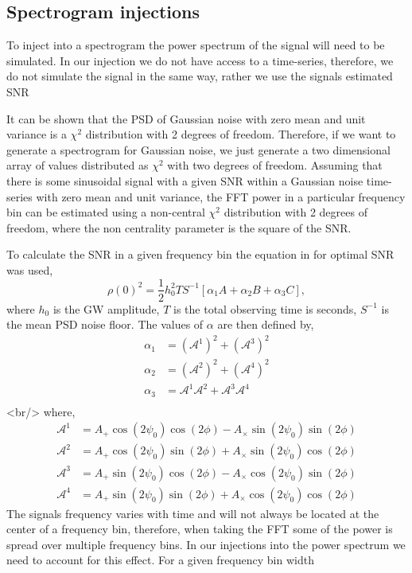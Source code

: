 \subsection{Spectrogram injections}

To inject into a spectrogram the power spectrum of the signal will need to be simulated. In our injection we do not have access to a time-series, therefore, we do not simulate the signal in the same way, rather we use the signals estimated \ac{SNR}

It can be shown that the \ac{PSD} of Gaussian noise with zero mean and unit variance is a $\chi^2$ distribution with 2 degrees of freedom. Therefore, if we want to generate a spectrogram for Gaussian noise, we just generate a two dimensional array of values distributed as $\chi^2$ with two degrees of freedom.
Assuming that there is some sinusoidal signal with a given \ac{SNR} within a Gaussian noise time-series with zero mean and unit variance, the \ac{FFT} power in a particular frequency bin can be estimated using a non-central $\chi^2$ distribution with 2 degrees of freedom, where the non centrality parameter is the square of the \ac{SNR}. 

To calculate the \ac{SNR} in a given frequency bin the equation in \citep{Prix2007} for optimal \ac{SNR} was used,
\begin{equation}
    \rho(0)^2 = \frac{1}{2}h_0^2 T S^{-1} \left[ \alpha_1 A + \alpha_2 B + \alpha_3 C \right],
\end{equation}
where $h_0$ is the \ac{GW} amplitude, $T$ is the total observing time is seconds, $S^{-1}$ is the mean \ac{PSD} noise floor. The values of $\alpha$ are then defined by,
\begin{equation}
\begin{split}
\alpha_1 &= (\mathcal{A}^1)^2 + (\mathcal{A}^3)^2\\
\alpha_2 &= (\mathcal{A}^2)^2 + (\mathcal{A}^4)^2 \\
\alpha_3 &= \mathcal{A}^1\mathcal{A}^2 + \mathcal{A}^3\mathcal{A}^4 \\
\end{split}
\end{equation}
<br/>
where,
\begin{equation}
\begin{split}
\mathcal{A}^1 &= A_{+}\cos(2\psi_0)\cos(2\phi) - A_{\times}\sin(2\psi_0)\sin(2\phi) \\
\mathcal{A}^2 &= A_{+}\cos(2\psi_0)\sin(2\phi) + A_{\times}\sin(2\psi_0)\cos(2\phi) \\
\mathcal{A}^3 &= A_{+}\sin(2\psi_0)\cos(2\phi) - A_{\times}\cos(2\psi_0)\sin(2\phi) \\
\mathcal{A}^4 &= A_{+}\sin(2\psi_0)\sin(2\phi) + A_{\times}\cos(2\psi_0)\cos(2\phi) 
\end{split}
\end{equation}
The signals frequency varies with time and will not always be located at the center of a frequency bin, therefore, when taking the \ac{FFT} some of the power is spread over multiple frequency bins. 
In our injections into the power spectrum we need to account for this effect. 
For a given frequency bin width 
